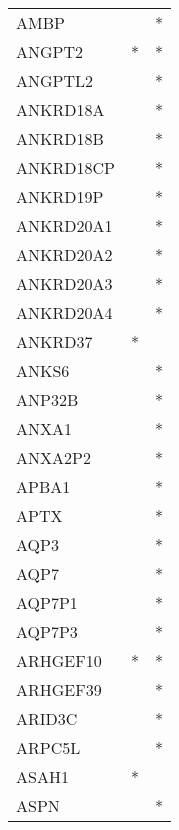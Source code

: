 \begin{longtable}{lcc}
AMBP                  &                &          * \\
ANGPT2                &              * &          * \\
ANGPTL2               &                &          * \\
ANKRD18A              &                &          * \\
ANKRD18B              &                &          * \\
ANKRD18CP             &                &          * \\
ANKRD19P              &                &          * \\
ANKRD20A1             &                &          * \\
ANKRD20A2             &                &          * \\
ANKRD20A3             &                &          * \\
ANKRD20A4             &                &          * \\
ANKRD37               &              * &            \\
ANKS6                 &                &          * \\
ANP32B                &                &          * \\
ANXA1                 &                &          * \\
ANXA2P2               &                &          * \\
APBA1                 &                &          * \\
APTX                  &                &          * \\
AQP3                  &                &          * \\
AQP7                  &                &          * \\
AQP7P1                &                &          * \\
AQP7P3                &                &          * \\
ARHGEF10              &              * &          * \\
ARHGEF39              &                &          * \\
ARID3C                &                &          * \\
ARPC5L                &                &          * \\
ASAH1                 &              * &            \\
ASPN                  &                &          * \\

\end{longtable}
